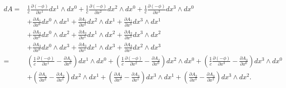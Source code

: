 \begin{align*}
	dA = 
	& \frac{1}{c}\frac{\partial (-\phi)}{\partial x^1} dx^1 \wedge dx^0
	+ \frac{1}{c}\frac{\partial (-\phi)}{\partial x^2} dx^2 \wedge dx^0
	+ \frac{1}{c}\frac{\partial (-\phi)}{\partial x^3} dx^3 \wedge dx^0\\
	& + \frac{\partial A_1}{\partial x^0} dx^0 \wedge dx^1
	+ \frac{\partial A_1}{\partial x^2} dx^2 \wedge dx^1
	+ \frac{\partial A_1}{\partial x^3} dx^3 \wedge dx^1\\
	& + \frac{\partial A_2}{\partial x^0} dx^0 \wedge dx^2
	+ \frac{\partial A_2}{\partial x^1} dx^1 \wedge dx^2
	+ \frac{\partial A_2}{\partial x^3} dx^3 \wedge dx^2\\
	& + \frac{\partial A_3}{\partial x^0} dx^0 \wedge dx^3
	+ \frac{\partial A_3}{\partial x^1} dx^1 \wedge dx^3
	+ \frac{\partial A_3}{\partial x^2} dx^2 \wedge dx^3\\[2ex] =
	& \left(\frac{1}{c}\frac{\partial (-\phi)}{\partial x^1}-\frac{\partial A_1}{\partial x^0}\right) dx^1 \wedge dx^0 +
	\left(\frac{1}{c}\frac{\partial (-\phi)}{\partial x^2}-\frac{\partial A_2}{\partial x^0}\right) dx^2 \wedge dx^0 +
	\left(\frac{1}{c}\frac{\partial (-\phi)}{\partial x^3}-\frac{\partial A_3}{\partial x^0}\right) dx^3 \wedge dx^0\\
	& + \left(\frac{\partial A_1}{\partial x^2}-\frac{\partial A_2}{\partial x^1}\right) dx^2 \wedge dx^1 +
	\left(\frac{\partial A_1}{\partial x^3}-\frac{\partial A_3}{\partial x^1}\right) dx^3 \wedge dx^1 +
	\left(\frac{\partial A_2}{\partial x^3}-\frac{\partial A_3}{\partial x^2}\right) dx^3 \wedge dx^2.				
\end{align*}

